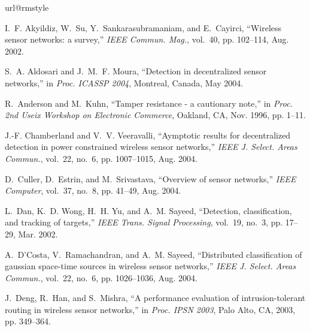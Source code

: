 \documentclass[12pt, onecolumn, draftcls]{IEEEtran}
\begin{document}
\begin{thebibliography}{10}
\providecommand{\url}[1]{#1} \csname url@rmstyle\endcsname
\providecommand{\newblock}{\relax} \providecommand{\bibinfo}[2]{#2}
\providecommand\BIBentrySTDinterwordspacing{\spaceskip=0pt\relax}
\providecommand\BIBentryALTinterwordstretchfactor{4}
\providecommand\BIBentryALTinterwordspacing{\spaceskip=\fontdimen2\font
plus \BIBentryALTinterwordstretchfactor\fontdimen3\font minus
  \fontdimen4\font\relax}
\providecommand\BIBforeignlanguage[2]{{\expandafter\ifx\csname l@#1\endcsname\relax
\typeout{** WARNING: IEEEtran.bst: No hyphenation pattern has been}\typeout{** loaded for the language `#1'. Using the pattern for}\typeout{** the default language instead.}\else \language=\csname l@#1\endcsname \fi #2}}

I.~F. Akyildiz, W.~Su, Y.~Sankarasubramaniam, and E.~Cayirci,
``Wireless sensor
  networks: a survey,'' \emph{{IEEE} Commun. Mag.}, vol.~40, pp. 102--114, Aug.
  2002.

S.~A. Aldosari and J.~M.~F. Moura, ``Detection in decentralized
sensor
  networks,'' in \emph{Proc. ICASSP 2004}, Montreal, Canada, May 2004.

R.~Anderson and M.~Kuhn, ``Tamper resistance - a cautionary note,''
in
  \emph{Proc. 2nd Useix Workshop on Electronic Commerce}, Oakland, CA, Nov.
  1996, pp. 1--11.

J.-F. Chamberland and V.~V. Veeravalli, ``Aymptotic results for
decentralized
  detection in power constrained wireless sensor networks,'' \emph{{IEEE} J.
  Select. Areas Commun.}, vol.~22, no.~6, pp. 1007--1015, Aug. 2004.

D.~Culler, D.~Estrin, and M.~Srivastava, ``Overview of sensor
networks,''
  \emph{{IEEE} Computer}, vol.~37, no.~8, pp. 41--49, Aug. 2004.

L.~Dan, K.~D. Wong, H.~H. Yu, and A.~M. Sayeed, ``Detection,
classification,
  and tracking of targets,'' \emph{{IEEE} Trans. Signal Processing}, vol.~19,
  no.~3, pp. 17--29, Mar. 2002.

A.~D'Costa, V.~Ramachandran, and A.~M. Sayeed, ``Distributed
classification of
  gaussian space-time sources in wireless sensor networks,'' \emph{{IEEE} J.
  Select. Areas Commun.}, vol.~22, no.~6, pp. 1026--1036, Aug. 2004.

J.~Deng, R.~Han, and S.~Mishra, ``A performance evaluation of
  intrusion-tolerant routing in wireless sensor networks,'' in \emph{Proc. IPSN
  2003}, Palo Alto, CA, 2003, pp. 349--364.


\end{thebibliography}
\end{document}

